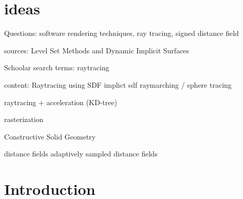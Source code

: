 
\section{ideas}
Questions: software rendering techniques, ray tracing, signed distance field

sources: Level Set Methods and Dynamic Implicit Surfaces

Schoolar search terms: 
raytracing


content:
Raytracing using SDF
implict
sdf
raymarching / sphere tracing

raytracing + acceleration (KD-tree)

rasterization

Constructive Solid Geometry

distance fields
adaptively sampled distance fields

\section{Introduction}
\label{section:Introduction}